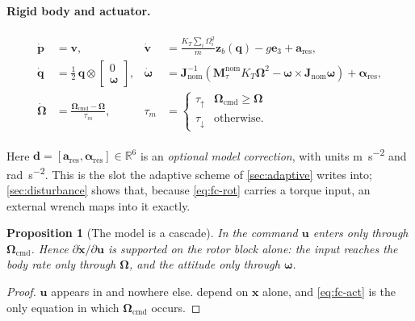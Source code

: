 \documentclass[11pt,a4paper,twoside,openright]{report}
\newcommand{\R}{\mathbb{R}}
\renewcommand{\vec}[1]{\bm{#1}}
\newcommand{\mat}[1]{\bm{#1}}
\newcommand{\ctrlstate}{\vec{x}}
\newcommand{\inp}{\vec{u}}
\newcommand{\dres}{\vec{d}}
\newcommand{\quat}{\vec{q}}
\newcommand{\bodyrate}{\vec{\omega}}
\theoremstyle{plain}
\newtheorem{proposition}[theorem]{Proposition}
\theoremstyle{definition}
\theoremstyle{remark}
\begin{document}
	\paragraph{Rigid body and actuator.}
	\begin{align}
		\dot{\vec p} &= \vec v,
		&\dot{\vec v} &= \frac{K_T\sum_i\Omega_i^{2}}{m}\vec z_b(\quat)-g\vec e_3
		+\vec a_\mathrm{res},
		\label{eq:fc-trans}\\[2pt]
		\dot{\quat} &= \tfrac12\,\quat\otimes
		\begin{bmatrix}0\\ \bodyrate\end{bmatrix},
		&\dot{\bodyrate} &= \mat J_\mathrm{nom}^{-1}\!\left(
		\mat M_\tau^\mathrm{nom}K_T\vec\Omega^{2}
		-\bodyrate\times\mat J_\mathrm{nom}\bodyrate\right)+\vec\alpha_\mathrm{res},
		\label{eq:fc-rot}\\[2pt]
		\dot{\vec\Omega} &= \frac{\vec\Omega_\mathrm{cmd}-\vec\Omega}{\tau_m},
		&\tau_m&=\begin{cases}\tau_\uparrow & \vec\Omega_\mathrm{cmd}\ge\vec\Omega\\
			\tau_\downarrow & \text{otherwise.}\end{cases}
		\label{eq:fc-act}
	\end{align}

	Here $\dres=[\vec a_\mathrm{res},\vec\alpha_\mathrm{res}]\in\R^6$ is an
	\emph{optional model correction}, with units \si{\metre\per\square\second} and
	\si{\radian\per\square\second}. This is the slot the adaptive scheme of
	\cref{sec:adaptive} writes into; \cref{sec:disturbance} shows that, because
	\cref{eq:fc-rot} carries a torque input, an external wrench maps into it
	exactly.

	\begin{proposition}[The model is a cascade]
		\label{prop:cascade}
		In  the command $\inp$ enters only through
		$\vec\Omega_\mathrm{cmd}$. Hence $\partial\dot{\ctrlstate}/\partial\inp$ is
		supported on the rotor block alone: the input reaches the body rate only
		through $\vec\Omega$, and the attitude only through $\bodyrate$.
	\end{proposition}

	\begin{proof}
		$\inp$ appears in  and nowhere else.
		 depend on $\ctrlstate$ alone, and
		\cref{eq:fc-act} is the only equation in which $\vec\Omega_\mathrm{cmd}$
		occurs.
	\end{proof}
\end{document}
